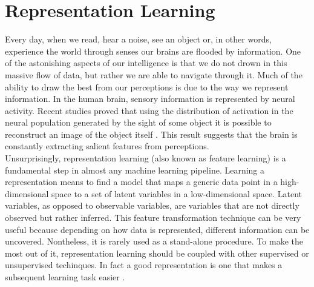 \section{Representation Learning}
Every day, when we read, hear a noise, see an object or, in other words, experience the world through senses our brains are flooded by information. One of the astonishing aspects of our intelligence is that we do not drown in this massive flow of data, but rather we are able to navigate through it. Much of the ability to draw the best from our perceptions is due to the way we represent information. In the human brain, sensory information is represented by neural activity. Recent studies proved that using the distribution of activation in the neural population generated by the sight of some object it is possible to reconstruct an image of the object itself \cite{shen2019deep}. This result suggests that the brain is constantly extracting salient features from perceptions.\\
Unsurprisingly, representation learning (also known as feature learning) is a fundamental step in almost any machine learning pipeline. Learning a representation means to find a model that maps a generic data point in a high-dimensional space to a set of latent variables in a low-dimensional space. Latent variables, as opposed to observable variables, are variables that are not directly observed but rather inferred. This feature transformation technique can be very useful because depending on how data is represented, different information can be uncovered. Nontheless, it is rarely used as a stand-alone procedure. To make the most out of it, representation learning should be coupled with other supervised or unsupervised techinques. In fact a good representation is one that makes a subsequent learning task easier \cite[Chapter~15]{goodfellow2016deep}.\\ %
